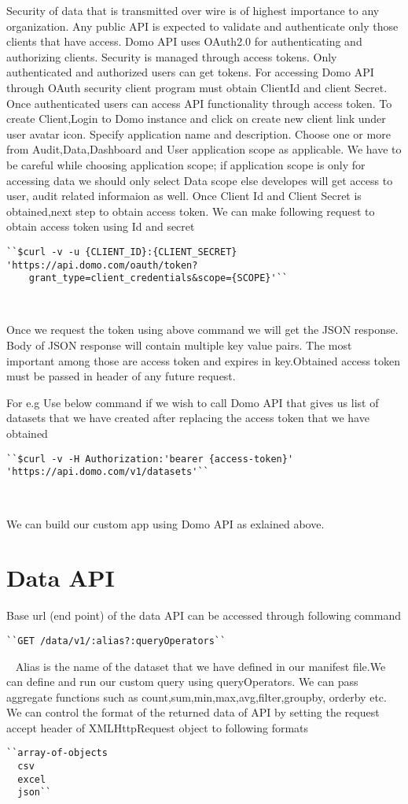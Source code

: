 Security of data that is transmitted over wire is of highest
importance to any organization. Any public API is expected to 
validate and authenticate only those clients that have access.
Domo API uses OAuth2.0 for authenticating and authorizing clients.
Security is managed through access tokens. Only authenticated
and authorized users can get tokens. For accessing Domo API through
OAuth security client program must obtain ClientId and client Secret.
Once authenticated users can access API functionality through access
token.
To create Client,Login to Domo instance and click on create new 
client link under user avatar icon. Specify application name and
description. Choose one or more from Audit,Data,Dashboard and User
application scope as applicable. We have to be careful while choosing
application scope; if application scope is only for accessing data we
should only select Data scope else developes will get access to user,
audit related informaion as well. Once Client Id and Client Secret is
obtained,next step to obtain access token. We can make following request
to obtain access token using Id and secret~\cite{hid-sp18-523-Authticate}
\begin{verbatim}
``$curl -v -u {CLIENT_ID}:{CLIENT_SECRET} 
'https://api.domo.com/oauth/token?
	grant_type=client_credentials&scope={SCOPE}'``
\end{verbatim}
~\cite{hid-sp18-523-Authticate}

Once we request the token using above command we will get the JSON response.
Body of JSON response will contain multiple key value pairs. The most
important among those are access token and expires in key.Obtained access 
token must be passed in header of any future request.

For e.g Use below command if we wish to call Domo API that gives us list of 
datasets that we have created after replacing the access token that we have
obtained
\begin{verbatim}
``$curl -v -H Authorization:'bearer {access-token}' 
'https://api.domo.com/v1/datasets'``
\end{verbatim}
~\cite{hid-sp18-523-Authticate}

We can build our custom app using Domo API as exlained above.


\section{Data API}
Base url (end point) of the data API can be accessed through following
command
\begin{verbatim}
``GET /data/v1/:alias?:queryOperators``
\end{verbatim}
~\cite{hid-sp18-523-DataApi}
Alias is the name of the dataset that we have defined in our manifest
file.We can define and run our custom query using queryOperators. We can
pass aggregate functions such as count,sum,min,max,avg,filter,groupby,
orderby etc. We can control the format of the returned data of API by
setting the request accept header of XMLHttpRequest object to following 
formats~\cite{hid-sp18-523-DataApi} 
\begin{verbatim}
``array-of-objects
  csv
  excel
  json``
\end{verbatim}
~\cite{hid-sp18-523-DataApi}

